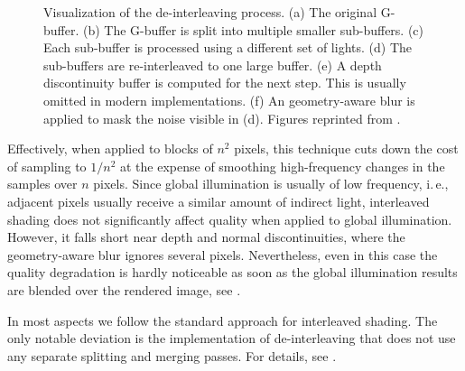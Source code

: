 \begin{figure}[htb]
\begin{subfigure}[b]{0.33\textwidth}
    \caption{}
    \label{fig:concept:interleaved_segovia_6}
  \end{subfigure}
  \caption{Visualization of the de-interleaving process. (a) The original G-buffer. (b) The G-buffer is split into multiple smaller sub-buffers. (c) Each sub-buffer is processed using a different set of lights. (d) The sub-buffers are re-interleaved to one large buffer. (e) A depth discontinuity buffer is computed for the next step. This is usually omitted in modern implementations. (f) An geometry-aware blur is applied to mask the noise visible in (d). Figures reprinted from \citet{segovia2006non}.}
  \label{fig:concept:interleaved_segovia}
\end{figure}


Effectively, when applied to blocks of $n^2$ pixels, this technique cuts down the cost of sampling to $ 1 / n^2 $ at the expense of smoothing high-frequency changes in the samples over $n$ pixels. Since global illumination is usually of low frequency, i.\,e., adjacent pixels usually receive a similar amount of indirect light, interleaved shading does not significantly affect quality when applied to global illumination. However, it falls short near depth and normal discontinuities, where the geometry-aware blur ignores several pixels. Nevertheless, even in this case the quality degradation is hardly noticeable as soon as the global illumination results are blended over the rendered image, see .

In most aspects we follow the standard approach for interleaved shading. The only notable deviation is the implementation of de-interleaving that does not use any separate splitting and merging passes. For details, see .
